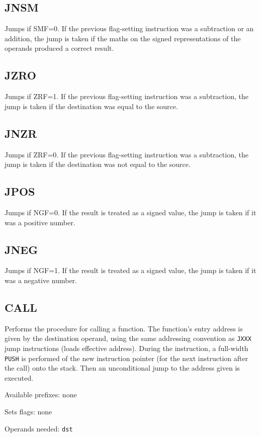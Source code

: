 \documentclass[12pt,a4paper]{report}
\begin{document}
\subsection*{JNSM}
Jumps if SMF=0. If the previous flag-setting instruction was a subtraction or an addition, the jump is taken if the maths on the signed representations of the operands produced a correct result.

\subsection*{JZRO}
Jumps if ZRF=1. If the previous flag-setting instruction was a subtraction, the jump is taken if the destination was equal to the source.

\subsection*{JNZR}
Jumps if ZRF=0. If the previous flag-setting instruction was a subtraction, the jump is taken if the destination was not equal to the source.

\subsection*{JPOS}
Jumps if NGF=0. If the result is treated as a signed value, the jump is taken if it was a positive number.

\subsection*{JNEG}
Jumps if NGF=1. If the result is treated as a signed value, the jump is taken if it was a negative number.

\subsection*{CALL}
Performs the procedure for calling a function. The function's entry address is given by the destination operand, using the same addressing convention as \texttt{JXXX} jump instructions (loads effective address). During the instruction, a full-width \texttt{PUSH} is performed of the new instruction pointer (for the next instruction after the call) onto the stack. Then an unconditional jump to the address given is executed.

Available prefixes: none

Sets flags: none

Operands needed: \texttt{dst}
\end{document}
